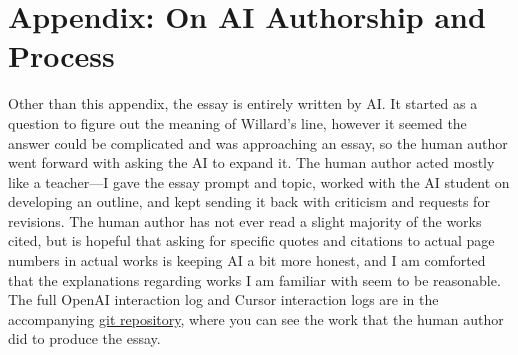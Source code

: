 \section*{Appendix: On AI Authorship and Process}
\label{app:ai-authorship}

Other than this appendix, the essay is entirely written by AI. It started as a question to
figure out the meaning of Willard's line, however it seemed the answer could be complicated
and was approaching an essay, so the human author went forward with asking the AI to expand
it. The human author acted mostly like a teacher---I gave the essay prompt and topic, worked
with the AI student on developing an outline, and kept sending it back with criticism and
requests for revisions. The human author has not ever read a slight majority of the works
cited, but is hopeful that asking for specific quotes and citations to actual page numbers in
actual works is keeping AI a bit more honest, and I am comforted that the explanations
regarding works I am familiar with seem to be reasonable. The full OpenAI interaction log and
Cursor interaction logs are in the accompanying
\href{https://github.com/jmalicki/apocalypse-now-essay/tree/main/interaction-logs}{git
	repository}, where you can see the work that the human author did to produce the essay.
